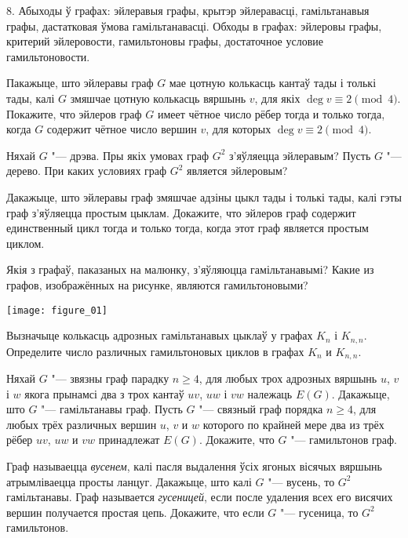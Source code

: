 \documentclass[12pt, a4paper]{article}
\begin{document}
\biLangHeader
{8. Абыходы ў графах: эйлеравыя графы, крытэр эйлеравасці, гамільтанавыя графы, дастатковая ўмова гамільтанавасці.}
{Обходы в графах: эйлеровы графы, критерий эйлеровости, гамильтоновы графы, достаточное условие гамильтоновости.}

\begin{problemList}

\problemItemSimple
{Пакажыце, што эйлеравы граф $G$ мае цотную колькасць кантаў тады і толькі тады,
калі $G$ змяшчае цотную колькасць вяршынь $v$, для якіх $\deg v \equiv 2\pmod{4}$.}
{Покажите, что эйлеров граф $G$ имеет чётное число рёбер тогда и только тогда,
когда $G$ содержит чётное число вершин $v$, для которых $\deg v \equiv 2\pmod{4}$.}

\bigskip

\problemItemSimple
{Няхай $G$ "--- дрэва. Пры якіх умовах граф $G^2$ з'яўляецца эйлеравым?}
{Пусть $G$ "--- дерево. При каких условиях граф $G^2$ является эйлеровым?}

\bigskip

\problemItemSimple
{Дакажыце, што эйлеравы граф змяшчае адзіны цыкл тады і толькі тады,
калі гэты граф з'яўляецца простым цыклам.}
{Докажите, что эйлеров граф содержит единственный цикл тогда и только тогда,
когда этот граф является простым циклом.}

\bigskip

\problemItemWithCommonPart
{Якія з графаў, паказаных на малюнку, з'яўляюцца гамільтанавымі?}
{Какие из графов, изображённых на рисунке, являются гамильтоновыми?}
{%
\begin{center}
    \texttt{[image: figure\_01]}
\end{center}
}

\problemItemSimple
{Вызначыце колькасць адрозных гамільтанавых цыклаў у графах $K_n$ і $K_{n, n}$.}
{Определите число различных гамильтоновых циклов в графах $K_n$ и $K_{n, n}$.}

\bigskip

\problemItemSimple
{Няхай $G$ "--- звязны граф парадку $n\ge 4$, для любых трох адрозных вяршынь $u$, $v$ і $w$
якога прынамсі два з трох кантаў $uv$, $uw$ і $vw$ належаць $E(G)$.
Дакажыце, што $G$ "--- гамільтанавы граф.}
{Пусть $G$ "--- связный граф порядка $n\ge 4$, для любых трёх различных вершин $u$, $v$ и $w$
которого по крайней мере два из трёх рёбер $uv$, $uw$ и $vw$ принадлежат $E(G)$.
Докажите, что $G$ "--- гамильтонов граф.}

\bigskip

\problemItemSimple
{Граф называецца \textit{вусенем}, калі пасля выдалення ўсіх ягоных вісячых вяршынь атрымліваецца просты ланцуг.
Дакажыце, што калі $G$ "--- вусень, то $G^2$ гамільтанавы.}
{Граф называется \textit{гусеницей}, если после удаления всех его висячих вершин получается простая цепь.
Докажите, что если $G$ "--- гусеница, то $G^2$ гамильтонов.}


\end{problemList}
\end{document}
